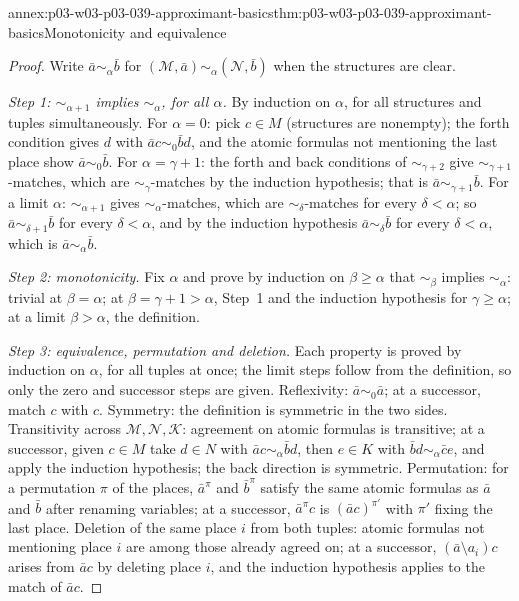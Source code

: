 \begin{annexitem}{annex:p03-w03-p03-039-approximant-basics}{thm:p03-w03-p03-039-approximant-basics}{Monotonicity and equivalence}
\begin{proof}
Write \(\bar a\sim_\alpha\bar b\) for
\((\mathcal M,\bar a)\sim_\alpha(\mathcal N,\bar b)\) when the structures are
clear.

\emph{Step 1: \(\sim_{\alpha+1}\) implies \(\sim_\alpha\), for all \(\alpha\).}
By induction on \(\alpha\), for all structures and tuples simultaneously.
For \(\alpha=0\): pick \(c\in M\) (structures are nonempty); the forth
condition gives \(d\) with \(\bar ac\sim_0\bar bd\), and the atomic formulas
not mentioning the last place show \(\bar a\sim_0\bar b\). For
\(\alpha=\gamma+1\): the forth and back conditions of \(\sim_{\gamma+2}\)
give \(\sim_{\gamma+1}\)-matches, which are \(\sim_\gamma\)-matches by the
induction hypothesis; that is \(\bar a\sim_{\gamma+1}\bar b\). For a limit
\(\alpha\): \(\sim_{\alpha+1}\) gives \(\sim_\alpha\)-matches, which are
\(\sim_\delta\)-matches for every \(\delta<\alpha\); so
\(\bar a\sim_{\delta+1}\bar b\) for every \(\delta<\alpha\), and by the
induction hypothesis \(\bar a\sim_\delta\bar b\) for every \(\delta<\alpha\),
which is \(\bar a\sim_\alpha\bar b\).

\emph{Step 2: monotonicity.} Fix \(\alpha\) and prove by induction on
\(\beta\ge\alpha\) that \(\sim_\beta\) implies \(\sim_\alpha\): trivial at
\(\beta=\alpha\); at \(\beta=\gamma+1>\alpha\), Step~1 and the induction
hypothesis for \(\gamma\ge\alpha\); at a limit \(\beta>\alpha\), the
definition.

\emph{Step 3: equivalence, permutation and deletion.} Each property is
proved by induction on \(\alpha\), for all tuples at once; the limit steps
follow from the definition, so only the zero and successor steps are given.
Reflexivity: \(\bar a\sim_0\bar a\); at a successor, match \(c\) with \(c\).
Symmetry: the definition is symmetric in the two sides. Transitivity across
\(\mathcal M,\mathcal N,\mathcal K\): agreement on atomic formulas is
transitive; at a successor, given \(c\in M\) take \(d\in N\) with
\(\bar ac\sim_\alpha\bar bd\), then \(e\in K\) with
\(\bar bd\sim_\alpha\bar ce\), and apply the induction hypothesis; the back
direction is symmetric. Permutation: for a permutation \(\pi\) of the places,
\(\bar a^\pi\) and \(\bar b^\pi\) satisfy the same atomic formulas as
\(\bar a\) and \(\bar b\) after renaming variables; at a successor,
\(\bar a^\pi c\) is \((\bar ac)^{\pi'}\) with \(\pi'\) fixing the last place.
Deletion of the same place \(i\) from both tuples: atomic formulas not
mentioning place \(i\) are among those already agreed on; at a successor,
\((\bar a\setminus a_i)c\) arises from \(\bar ac\) by deleting place \(i\),
and the induction hypothesis applies to the match of \(\bar ac\).
\end{proof}
\end{annexitem}

